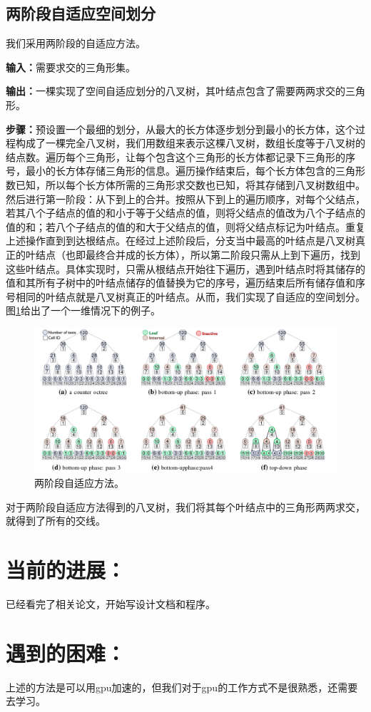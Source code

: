 \documentclass[a4paper,twoside]{article}
\begin{document}
\subsection{两阶段自适应空间划分}
我们采用两阶段的自适应方法。

\textbf{输入：}需要求交的三角形集。

\textbf{输出：}一棵实现了空间自适应划分的八叉树，其叶结点包含了需要两两求交的三角形。

\textbf{步骤：}预设置一个最细的划分，从最大的长方体逐步划分到最小的长方体，这个过程构成了一棵完全八叉树，我们用数组来表示这棵八叉树，数组长度等于八叉树的结点数。遍历每个三角形，让每个包含这个三角形的长方体都记录下三角形的序号，最小的长方体存储三角形的信息。遍历操作结束后，每个长方体包含的三角形数已知，所以每个长方体所需的三角形求交数也已知，将其存储到八叉树数组中。然后进行第一阶段：从下到上的合并。按照从下到上的遍历顺序，对每个父结点，若其八个子结点的值的和小于等于父结点的值，则将父结点的值改为八个子结点的值的和；若八个子结点的值的和大于父结点的值，则将父结点标记为叶结点。重复上述操作直到到达根结点。在经过上述阶段后，分支当中最高的叶结点是八叉树真正的叶结点（也即最终合并成的长方体），所以第二阶段只需从上到下遍历，找到这些叶结点。具体实现时，只需从根结点开始往下遍历，遇到叶结点时将其储存的值和其所有子树中的叶结点储存的值替换为它的序号，遍历结束后所有储存值和序号相同的叶结点就是八叉树真正的叶结点。从而，我们实现了自适应的空间划分。图\ref{fig:6}给出了一个一维情况下的例子。


\begin{figure}[H]
    \centering
    \includegraphics[width=1\linewidth]{png/6.png}
    \caption{两阶段自适应方法。}
    \label{fig:6}
\end{figure}


对于两阶段自适应方法得到的八叉树，我们将其每个叶结点中的三角形两两求交，就得到了所有的交线。


\section{当前的进展：}
已经看完了相关论文，开始写设计文档和程序。


\section{遇到的困难：}
上述的方法是可以用gpu加速的，但我们对于gpu的工作方式不是很熟悉，还需要去学习。




\end{document}
